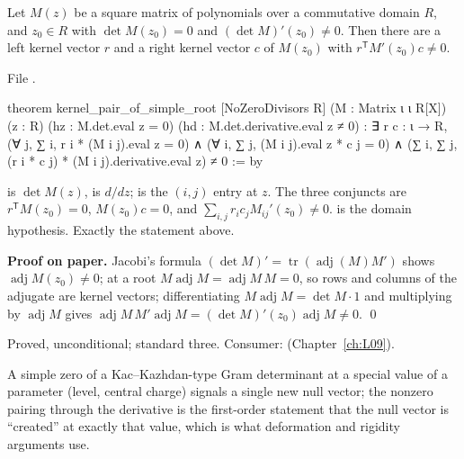 \begin{theorem}\label{l11:thm:simpleroot}
Let $M(z)$ be a square matrix of polynomials over a commutative domain $R$, and $z_0\in R$ with $\det M(z_0) = 0$ and
$(\det M)'(z_0)\neq0$. Then there are a left kernel vector $r$ and a right kernel vector $c$ of $M(z_0)$ with
$r^{\mathsf T}M'(z_0)c\neq0$.
\end{theorem}
\noindent File .
\begin{leancode}
theorem kernel_pair_of_simple_root [NoZeroDivisors R]
    (M : Matrix ι ι R[X]) (z : R)
    (hz : M.det.eval z = 0) (hd : M.det.derivative.eval z ≠ 0) :
    ∃ r c : ι → R,
      (∀ j, ∑ i, r i * (M i j).eval z = 0) ∧
      (∀ i, ∑ j, (M i j).eval z * c j = 0) ∧
      (∑ i, ∑ j, (r i * c j) * (M i j).derivative.eval z) ≠ 0 := by
\end{leancode}

\begin{dictionary}
 is $\det M(z)$,  is $d/dz$;  is the $(i,j)$ entry at $z$.
The three conjuncts are $r^{\mathsf T}M(z_0) = 0$, $M(z_0)c = 0$, and $\sum_{i,j}r_ic_jM_{ij}'(z_0)\neq0$.
\lean{[NoZeroDivisors R]} is the domain hypothesis. Exactly the statement above.
\end{dictionary}

\textbf{Proof on paper.} Jacobi's formula $(\det M)' = \operatorname{tr}(\operatorname{adj}(M)M')$ shows
$\operatorname{adj}M(z_0)\neq0$; at a root $M\operatorname{adj}M = \operatorname{adj}M\,M = 0$, so rows and columns of
the adjugate are kernel vectors; differentiating $M\operatorname{adj}M = \det M\cdot1$ and multiplying by $\operatorname{adj}M$
gives $\operatorname{adj}M\,M'\operatorname{adj}M = (\det M)'(z_0)\operatorname{adj}M\neq0$. \qed

\begin{status}
Proved, unconditional; standard three. Consumer: 
(Chapter~\ref{ch:L09}).
\end{status}

\begin{physics}
A simple zero of a Kac--Kazhdan-type Gram determinant at a special value of a parameter (level, central charge)
signals a single new null vector; the nonzero pairing through the derivative is the first-order statement that the
null vector is ``created'' at exactly that value, which is what deformation and rigidity arguments use.
\end{physics}

